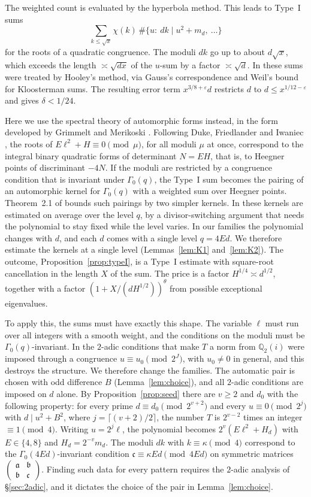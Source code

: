 \documentclass[11pt]{amsart}
\theoremstyle{remark}
\theoremstyle{definition}
\numberwithin{equation}{section}
\newcommand{\Q}{\mathbb{Q}}
\newcommand{\eps}{\varepsilon}
\newcommand{\ga}{\mathfrak{a}}
\newcommand{\gb}{\mathfrak{b}}
\newcommand{\gc}{\mathfrak{c}}
\begin{document}
The weighted count is evaluated by the hyperbola method. This leads to Type~I sums
\[
\sum_{k\le\sqrt x}\chi(k)\,\#\{u:\ dk\mid u^2+m_d,\ \dots\}
\]
for the roots of a quadratic congruence. The moduli $dk$ go up to about $d\sqrt x$, which exceeds the length $\asymp\sqrt{dx}$ of the $u$-sum by a factor $\asymp\sqrt d$. In \cite{I} these sums were treated by Hooley's method, via Gauss's correspondence and Weil's bound for Kloosterman sums. The resulting error term $x^{3/8+\eps}d$ restricts $d$ to $d\le x^{1/12-\eps}$ and gives $\delta<1/24$.

Here we use the spectral theory of automorphic forms instead, in the form developed by Grimmelt and Merikoski \cite{GM1,GM}. Following Duke, Friedlander and Iwaniec \cite{DFI95}, the roots of $E\ell^2+H\equiv0\pmod\mu$, for all moduli $\mu$ at once, correspond to the integral binary quadratic forms of determinant $N=EH$, that is, to Heegner points of discriminant $-4N$. If the moduli are restricted by a congruence condition that is invariant under $\Gamma_0(q)$, the Type~I sum becomes the pairing of an automorphic kernel for $\Gamma_0(q)$ with a weighted sum over Heegner points. Theorem~2.1 of \cite{GM} bounds such pairings by two simpler kernels. In \cite{GM} these kernels are estimated on average over the level $q$, by a divisor-switching argument that needs the polynomial to stay fixed while the level varies. In our families the polynomial changes with $d$, and each $d$ comes with a single level $q=4Ed$. We therefore estimate the kernels at a single level (Lemmas~\ref{lem:K1} and~\ref{lem:K2}). The outcome, Proposition~\ref{prop:typeI}, is a Type~I estimate with square-root cancellation in the length $X$ of the sum. The price is a factor $H^{1/4}\asymp d^{1/2}$, together with a factor $(1+X/(dH^{1/2}))^\theta$ from possible exceptional eigenvalues.

To apply this, the sums must have exactly this shape. The variable $\ell$ must run over all integers with a smooth weight, and the conditions on the moduli must be $\Gamma_0(q)$-invariant. In \cite{I} the $2$-adic conditions that make $T$ a norm from $\Q_2(i)$ were imposed through a congruence $u\equiv u_0\pmod{2^J}$, with $u_0\ne0$ in general, and this destroys the structure. We therefore change the families. The automatic pair is chosen with odd difference $B$ (Lemma~\ref{lem:choice}), and all $2$-adic conditions are imposed on $d$ alone. By Proposition~\ref{prop:seed} there are $v\ge2$ and $d_0$ with the following property: for every prime $d\equiv d_0\pmod{2^{v+2}}$ and every $u\equiv0\pmod{2^j}$ with $d\mid u^2+B^2$, where $j=\lceil(v+2)/2\rceil$, the number $T$ is $2^{v-2}$ times an integer $\equiv1\pmod 4$. Writing $u=2^j\ell$, the polynomial becomes $2^v(E\ell^2+H_d)$ with $E\in\{4,8\}$ and $H_d=2^{-v}m_d$. The moduli $dk$ with $k\equiv\kappa\pmod 4$ correspond to the $\Gamma_0(4Ed)$-invariant condition $\gc\equiv\kappa Ed\pmod{4Ed}$ on symmetric matrices $\left(\begin{smallmatrix}\ga&\gb\\ \gb&\gc\end{smallmatrix}\right)$. Finding such data for every pattern requires the $2$-adic analysis of \S\ref{sec:2adic}, and it dictates the choice of the pair in Lemma~\ref{lem:choice}.
\end{document}
